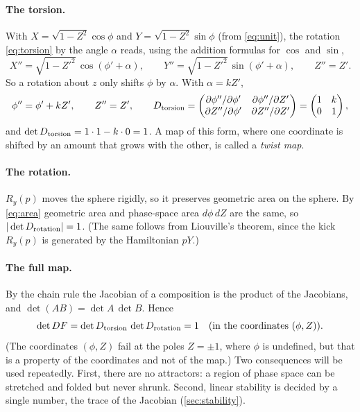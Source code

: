 \documentclass[11pt,a4paper]{article}
\begin{document}
\paragraph{The torsion.} With $X = \sqrt{1-Z^2}\cos\phi$ and $Y = \sqrt{1-Z^2}\sin\phi$ (from \eqref{eq:unit}), the
rotation \eqref{eq:torsion} by the angle $\alpha$ reads, using the addition formulas for $\cos$ and $\sin$,
\begin{equation*}
  X'' = \sqrt{1-Z'^2}\,\cos(\phi'+\alpha), \qquad Y'' = \sqrt{1-Z'^2}\,\sin(\phi'+\alpha), \qquad Z'' = Z' .
\end{equation*}
So a rotation about $z$ only shifts $\phi$ by $\alpha$. With $\alpha = kZ'$,
\begin{equation}\label{eq:twist}
  \phi'' = \phi' + kZ', \qquad Z'' = Z' ,
  \qquad
  D_{\rm torsion} = \begin{pmatrix} \partial\phi''/\partial\phi' & \partial\phi''/\partial Z'\\ \partial Z''/\partial\phi' & \partial Z''/\partial Z'\end{pmatrix}
  = \begin{pmatrix}1 & k\\ 0 & 1\end{pmatrix},
\end{equation}
and $\det D_{\rm torsion} = 1\cdot1 - k\cdot0 = 1$. A map of this form, where one coordinate is shifted by an amount
that grows with the other, is called a \emph{twist map}.

\paragraph{The rotation.} $R_y(p)$ moves the sphere rigidly, so it preserves geometric area on the sphere. By
\eqref{eq:area} geometric area and phase-space area $d\phi\,dZ$ are the same, so $|\det D_{\rm rotation}| = 1$. (The
same follows from Liouville's theorem, since the kick $R_y(p)$ is generated by the Hamiltonian $pY$.)

\paragraph{The full map.} By the chain rule the Jacobian of a composition is the product of the Jacobians, and
$\det(AB) = \det A\,\det B$. Hence
\begin{equation}
  \det DF = \det D_{\rm torsion}\,\det D_{\rm rotation} = 1 \quad\text{(in the coordinates $(\phi,Z)$)}.
\end{equation}
(The coordinates $(\phi,Z)$ fail at the poles $Z=\pm1$, where $\phi$ is undefined, but that is a property of the
coordinates and not of the map.) Two consequences will be used repeatedly. First, there are no attractors: a region of
phase space can be stretched and folded but never shrunk. Second, linear stability is decided by a single number,
the trace of the Jacobian (\cref{sec:stability}).
\end{document}
